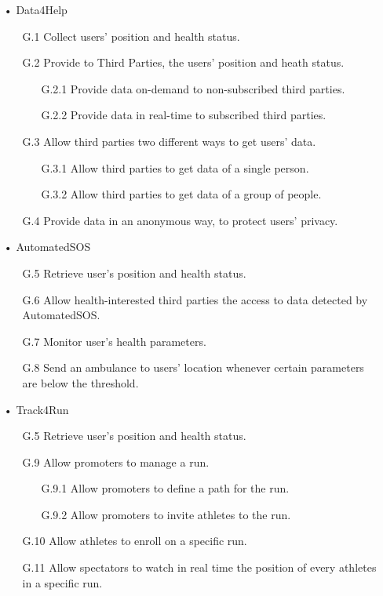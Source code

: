 \begin{enumerate}
\item[•] {\Large Data4Help}
	\begin{enumerate}
		\item [G.1] Collect users' position and health status.
		\item [G.2] Provide to Third Parties, the users' position and heath status.
		\begin{enumerate}
		\item [G.2.1] Provide data on-demand to non-subscribed third parties.
		\item [G.2.2] Provide data in real-time to subscribed third parties.
		\end{enumerate}
		\item [G.3] Allow third parties two different ways to get users' data.
		\begin{enumerate}
		\item [G.3.1] Allow third parties to get data of a single person.
		\item [G.3.2] Allow third parties to get data of a group of people.
		\end{enumerate}
		\item [G.4] Provide data in an anonymous way, to protect users' privacy.
	\end{enumerate}
	
\item[•] {\Large AutomatedSOS}
	\begin{enumerate}
		\item [G.5] Retrieve user's position and health status.
		\item [G.6] Allow health-interested third parties the access to data detected by AutomatedSOS.
		\item [G.7] Monitor user's health parameters.
		\item [G.8] Send an ambulance to users' location whenever certain parameters are below the threshold.
		\end{enumerate}
	
\item[•] {\Large Track4Run}	
	\begin{enumerate}
		\item [G.5] Retrieve user's position and health status.
		\item [G.9] Allow promoters to manage a run.
		\begin{enumerate}
		\item [G.9.1] Allow promoters to define a path for the run. 
		\item [G.9.2] Allow promoters to invite athletes to the run. 
		\end{enumerate}
		\item [G.10] Allow athletes to enroll on a specific run.
		\item [G.11] Allow spectators to watch in real time the position of every athletes in a specific run.
	\end{enumerate}
\end{enumerate}

